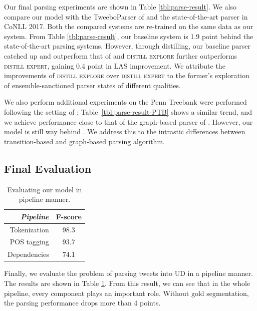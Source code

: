 \documentclass[11pt,a4paper]{article}
\begin{document}
Our final parsing experiments are shown in Table \ref{tbl:parse-result}.
We also compare our model with the {\sc TweeboParser} 
of \citet{kong-EtAl:2014:EMNLP2014} and the state-of-the-art parser
 \cite{DBLP:journals/corr/DozatM16} in CoNLL 2017.
Both the compared systems are re-trained on the same data as our system.
From Table \ref{tbl:parse-result}, our baseline system is 1.9 point behind the
state-of-the-art parsing systems. However, through distilling, our baseline
parser catched up and outperform that of \citet{DBLP:journals/corr/DozatM16} and 
\textsc{distill explore} further outperforms \textsc{distill expert}, gaining 0.4
point in LAS improvement. We attribute the improvements of \textsc{distill explore} over
\textsc{distill expert} to the former's exploration of 
ensemble-sanctioned parser states of different qualities.

We also perform additional experiments on the Penn Treebank were performed following
the setting of ;
Table~\ref{tbl:parse-result-PTB} shows a similar trend, and we achieve
performance close to that of the graph-based parser of \citet{kuncoro-16}.
However, our model is still way behind \citet{DBLP:journals/corr/DozatM16}.
We address this to the intrastic differences between transition-based and graph-based
parsing algorithm.

\subsection{Final Evaluation}
\begin{table}[t]
	\centering
	\begin{tabular}{rc}
		\hline
		\it Pipeline & F-score \\
		\hline
		Tokenization & 98.3 \\		
		POS tagging & 93.7 \\
		Dependencies & 74.1 \\
		\hline
	\end{tabular}
	\caption{Evaluating our model in pipeline manner.}\label{tbl:pipline}
\end{table}

Finally, we evaluate the problem of parsing tweets into UD in a pipeline manner.
The results are shown in Table \ref{tbl:pipline}. From this result, we can see
that in the whole pipeline, every component plays an important role. Without
gold segmentation, the parsing performance drops more than 4 points.
\end{document}
